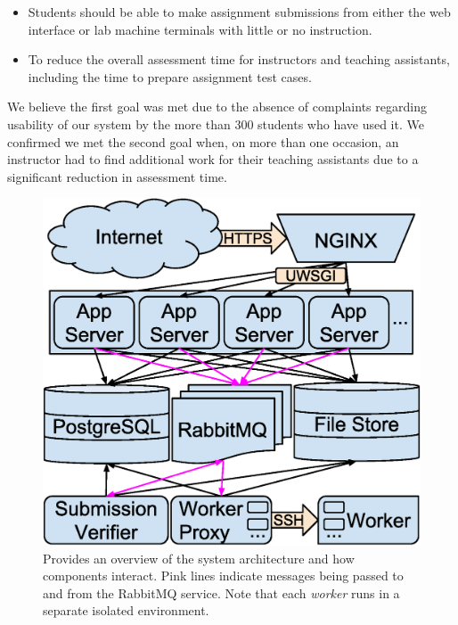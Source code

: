 \begin{itemize}
\item Students should be able to make assignment submissions from either the
  web interface or lab machine terminals with little or no instruction.
\item To reduce the overall assessment time for instructors and teaching
  assistants, including the time to prepare assignment test cases.
\end{itemize}

We believe the first goal was met due to the absence of complaints regarding
usability of our system by the more than 300 students who have used it. We
confirmed we met the second goal when, on more than one occasion, an instructor
had to find additional work for their teaching assistants due to a significant
reduction in assessment time.

\begin{figure}[!t]
\centering \includegraphics[width=5.25in]{graphs/architecture.eps}
\caption{Provides an overview of the system architecture and how components
  interact. Pink lines indicate messages being passed to and from the RabbitMQ
  service. Note that each \emph{worker} runs in a separate isolated
  environment.}
\end{figure}

